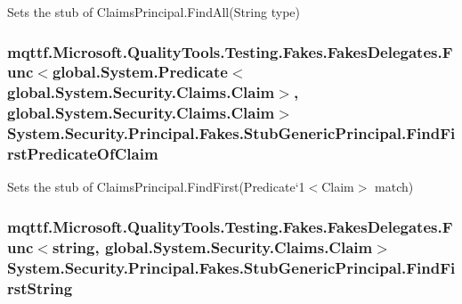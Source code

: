 Sets the stub of Claims\-Principal.\-Find\-All(\-String type)

\hypertarget{class_system_1_1_security_1_1_principal_1_1_fakes_1_1_stub_generic_principal_ad47fb8ab637eeb188eaaa82439b2382c}{
\subsubsection[{Find\-First\-Predicate\-Of\-Claim}]{\setlength{\rightskip}{0pt plus 5cm}mqttf.\-Microsoft.\-Quality\-Tools.\-Testing.\-Fakes.\-Fakes\-Delegates.\-Func$<$global.\-System.\-Predicate$<$global.\-System.\-Security.\-Claims.\-Claim$>$, global.\-System.\-Security.\-Claims.\-Claim$>$ System.\-Security.\-Principal.\-Fakes.\-Stub\-Generic\-Principal.\-Find\-First\-Predicate\-Of\-Claim}}\label{class_system_1_1_security_1_1_principal_1_1_fakes_1_1_stub_generic_principal_ad47fb8ab637eeb188eaaa82439b2382c}


Sets the stub of Claims\-Principal.\-Find\-First(Predicate`1$<$Claim$>$ match)

\hypertarget{class_system_1_1_security_1_1_principal_1_1_fakes_1_1_stub_generic_principal_a6da74d9f72399059a50d415089886003}{
\subsubsection[{Find\-First\-String}]{\setlength{\rightskip}{0pt plus 5cm}mqttf.\-Microsoft.\-Quality\-Tools.\-Testing.\-Fakes.\-Fakes\-Delegates.\-Func$<$string, global.\-System.\-Security.\-Claims.\-Claim$>$ System.\-Security.\-Principal.\-Fakes.\-Stub\-Generic\-Principal.\-Find\-First\-String}}\label{class_system_1_1_security_1_1_principal_1_1_fakes_1_1_stub_generic_principal_a6da74d9f72399059a50d415089886003}


